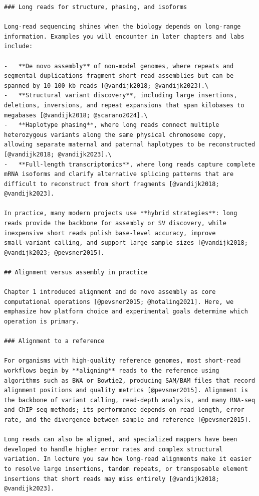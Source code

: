 \documentclass[
  letterpaper,
  DIV=11,
  numbers=noendperiod]{scrreprt}
\begin{document}
\begin{verbatim}
### Long reads for structure, phasing, and isoforms

Long‑read sequencing shines when the biology depends on long‑range information. Examples you will encounter in later chapters and labs include:

-   **De novo assembly** of non‑model genomes, where repeats and segmental duplications fragment short‑read assemblies but can be spanned by 10–100 kb reads [@vandijk2018; @vandijk2023].\
-   **Structural variant discovery**, including large insertions, deletions, inversions, and repeat expansions that span kilobases to megabases [@vandijk2018; @scarano2024].\
-   **Haplotype phasing**, where long reads connect multiple heterozygous variants along the same physical chromosome copy, allowing separate maternal and paternal haplotypes to be reconstructed [@vandijk2018; @vandijk2023].\
-   **Full‑length transcriptomics**, where long reads capture complete mRNA isoforms and clarify alternative splicing patterns that are difficult to reconstruct from short fragments [@vandijk2018; @vandijk2023].

In practice, many modern projects use **hybrid strategies**: long reads provide the backbone for assembly or SV discovery, while inexpensive short reads polish base‑level accuracy, improve small‑variant calling, and support large sample sizes [@vandijk2018; @vandijk2023; @pevsner2015].

## Alignment versus assembly in practice

Chapter 1 introduced alignment and de novo assembly as core computational operations [@pevsner2015; @hotaling2021]. Here, we emphasize how platform choice and experimental goals determine which operation is primary.

### Alignment to a reference

For organisms with high‑quality reference genomes, most short‑read workflows begin by **aligning** reads to the reference using algorithms such as BWA or Bowtie2, producing SAM/BAM files that record alignment positions and quality metrics [@pevsner2015]. Alignment is the backbone of variant calling, read‑depth analysis, and many RNA‑seq and ChIP‑seq methods; its performance depends on read length, error rate, and the divergence between sample and reference [@pevsner2015].

Long reads can also be aligned, and specialized mappers have been developed to handle higher error rates and complex structural variation. In lecture you saw how long‑read alignments make it easier to resolve large insertions, tandem repeats, or transposable element insertions that short reads may miss entirely [@vandijk2018; @vandijk2023].


\end{verbatim}
\end{document}

